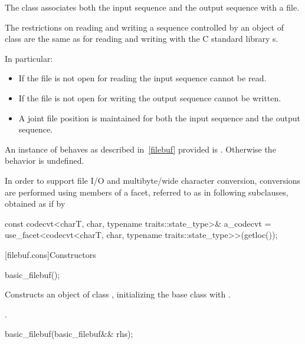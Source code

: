 \pnum
The class
associates both the input sequence and the output
sequence with a file.

\pnum
The restrictions on reading and writing a sequence controlled by an
object of class
are the same as for reading and writing with the C standard library
s.

\pnum
In particular:
\begin{itemize}
\item
If the file is not open for reading the input sequence
cannot be read.
\item
If the file is not open for writing the output
sequence cannot be written.
\item
A joint file position is maintained for both the input sequence and
the output sequence.
\end{itemize}

\pnum
An instance of
behaves as described in~\ref{filebuf} provided
is
.
Otherwise the behavior is undefined.

\pnum
In order to support file I/O and multibyte/wide character conversion,
conversions are performed using members of a facet, referred to as
 in following subclauses, obtained as if by

\begin{codeblock}
const codecvt<charT, char, typename traits::state_type>& a_codecvt =
  use_facet<codecvt<charT, char, typename traits::state_type>>(getloc());
\end{codeblock}

[filebuf.cons]{Constructors}

%
\begin{itemdecl}
basic_filebuf();
\end{itemdecl}

\begin{itemdescr}
\pnum
\effects
Constructs an object of class
,
initializing the base class with
.

\pnum
\ensures
{}.
\end{itemdescr}

%
\begin{itemdecl}
basic_filebuf(basic_filebuf&& rhs);
\end{itemdecl}

